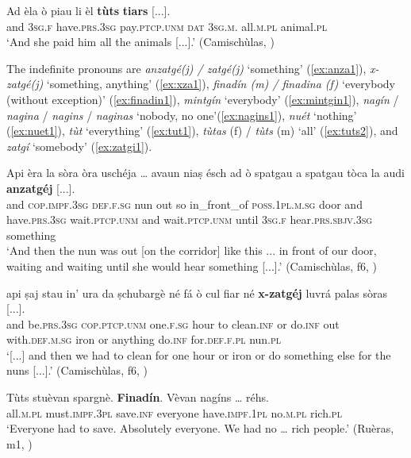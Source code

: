 \ea
\label{ex:tutstiars}
\gll Ad èla ò piau li èl \textbf{tùts} \textbf{tiars} [...].\\
and \textsc{3sg.f} have.\textsc{prs.3sg} pay.\textsc{ptcp.unm} \textsc{dat} \textsc{3sg.m.} all\textsc{.m.pl} animal.\textsc{pl}\\
\glt `And she paid him all the animals [...].' (Camischùlas, \citealt[14]{Büchli1966})
\z

The indefinite pronouns are \textit{anzatgé(j) / zatgé(j)} `something' (\ref{ex:anza1}), \textit{x-zatgé(j)} `something, anything' (\ref{ex:xza1}), \textit{finadín (m) / finadina (f)} `everybody (without exception)' (\ref{ex:finadin1}), \textit{mintgín} `everybody' (\ref{ex:mintgin1}), \textit{nagín} / \textit{nagina} / \textit{nagins} / \textit{naginas} `nobody, no one'(\ref{ex:nagins1}), \textit{nuét} `nothing' (\ref{ex:nuet1}), \textit{tùt} `everything' (\ref{ex:tut1}), \textit{tùtas} (f) / \textit{tùts} (m) `all' (\ref{ex:tuts2}), and \textit{zatgí} `somebody' (\ref{ex:zatgi1}).
 

\ea
\label{ex:anza1}
\gll    Api èra la sòra òra uschéja … avaun niaṣ ésch ad ò spatgau a spatgau tòca la audi \textbf{anzatgéj} [...].\\
and \textsc{cop.impf.3sg} \textsc{def.f.sg} nun out so {} in\_front\_of \textsc{poss.1pl.m.sg} door and have.\textsc{prs.3sg} wait.\textsc{ptcp.unm} and wait.\textsc{ptcp.unm} until \textsc{3sg.f} hear.\textsc{prs.sbjv.3sg} something\\
\glt `And then the nun was out [on the corridor] like this ... in front of our door, waiting and waiting until she would hear something  [...].' (Camischùlas, f6, )
\z

\ea
\label{ex:xza1}
\gll [...] api ṣaj stau in’ ura da ṣchubargè né fá ò cul fiar né \textbf{x-zatgéj} luvrá palas sòras [...].\\
{} and be.\textsc{prs.3sg} \textsc{cop.ptcp.unm} one.\textsc{f.sg} hour to clean.\textsc{inf} or do.\textsc{inf} out with.\textsc{def.m.sg} iron or anything do.\textsc{inf} for.\textsc{def.f.pl} nun.\textsc{pl} \\
\glt `[...] and then we had to clean for one hour or iron or do something else for the nuns [...].' (Camischùlas, f6, )
\z

\ea
\label{ex:finadin1}
\gll Tùts stuèvan spargnè. \textbf{Finadín}. Vèvan nagíns … réhs.\\
all.\textsc{m.pl} must.\textsc{impf.3pl} save.\textsc{inf} everyone have.\textsc{impf.1pl} no.\textsc{m.pl} {} rich.\textsc{pl}\\
\glt `Everyone had to save. Absolutely everyone. We had no … rich people.' (Ruèras, m1, )
\z

